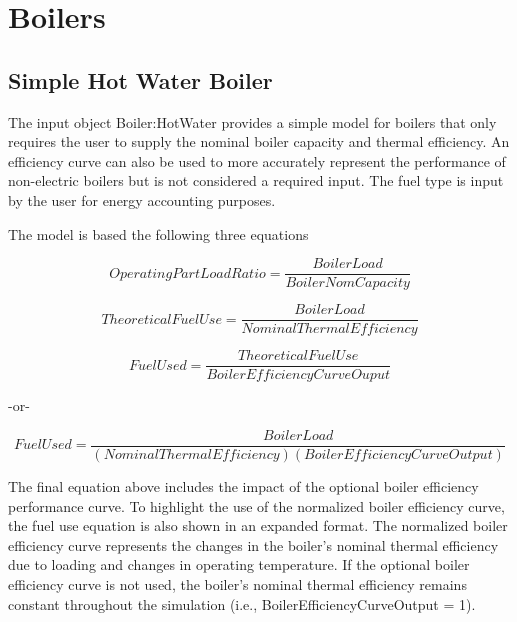 \section{Boilers }\label{boilers}

\subsection{Simple Hot Water Boiler}\label{simple-hot-water-boiler}

The input object Boiler:HotWater provides a simple model for boilers that only requires the user to supply the nominal boiler capacity and thermal efficiency. An efficiency curve can also be used to more accurately represent the performance of non-electric boilers but is not considered a required input. The fuel type is input by the user for energy accounting purposes.

The model is based the following three equations

\begin{equation}
OperatingPartLoadRatio = \frac{{BoilerLoad}}{{BoilerNomCapacity}}
\end{equation}

\begin{equation}
TheoreticalFuelUse = \frac{{BoilerLoad}}{{NominalThermalEfficiency}}
\end{equation}

\begin{equation}
FuelUsed = \frac{{TheoreticalFuelUse}}{{BoilerEfficiencyCurveOuput}}
\end{equation}

-or-

\begin{equation}
FuelUsed = \frac{{BoilerLoad}}{{\left( {NominalThermalEfficiency} \right)\left( {BoilerEfficiencyCurveOutput} \right)}}
\end{equation}

The final equation above includes the impact of the optional boiler efficiency performance curve. To highlight the use of the normalized boiler efficiency curve, the fuel use equation is also shown in an expanded format. The normalized boiler efficiency curve represents the changes in the boiler's nominal thermal efficiency due to loading and changes in operating temperature. If the optional boiler efficiency curve is not used, the boiler's nominal thermal efficiency remains constant throughout the simulation (i.e., BoilerEfficiencyCurveOutput = 1).

